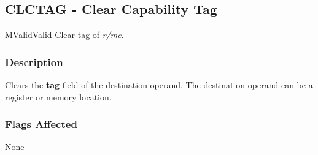 \clearpage
{}
{}
\subsection*{CLCTAG - Clear Capability Tag}

\begin{x86opcodetable}
  {M}{Valid}{Valid}
  {Clear tag of \emph{r/mc}.}
\end{x86opcodetable}

\begin{x86opentable}
\end{x86opentable}

\subsubsection*{Description}

Clears the \textbf{tag} field of the destination operand.  The
destination operand can be a register or memory location.

\subsubsection*{Flags Affected}

None
